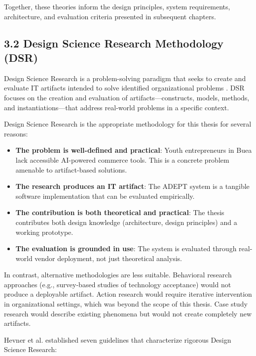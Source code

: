 \documentclass[12pt,a4paper]{article}
\begin{document}
Together, these theories inform the design principles, system requirements, architecture, and evaluation criteria presented in subsequent chapters.

\subsection{3.2 Design Science Research Methodology (DSR)}

Design Science Research is a problem-solving paradigm that seeks to create and evaluate IT artifacts intended to solve identified organizational problems \citep{hevner2004}. DSR focuses on the creation and evaluation of artifacts---constructs, models, methods, and instantiations---that address real-world problems in a specific context.

Design Science Research is the appropriate methodology for this thesis for several reasons:

\begin{itemize}
    \item \textbf{The problem is well-defined and practical}: Youth entrepreneurs in Buea lack accessible AI-powered commerce tools. This is a concrete problem amenable to artifact-based solutions.
    \item \textbf{The research produces an IT artifact}: The ADEPT system is a tangible software implementation that can be evaluated empirically.
    \item \textbf{The contribution is both theoretical and practical}: The thesis contributes both design knowledge (architecture, design principles) and a working prototype.
    \item \textbf{The evaluation is grounded in use}: The system is evaluated through real-world vendor deployment, not just theoretical analysis.
\end{itemize}

In contrast, alternative methodologies are less suitable. Behavioral research approaches (e.g., survey-based studies of technology acceptance) would not produce a deployable artifact. Action research would require iterative intervention in organizational settings, which was beyond the scope of this thesis. Case study research would describe existing phenomena but would not create completely new artifacts.

Hevner et al. \citep{hevner2004} established seven guidelines that characterize rigorous Design Science Research:
\end{document}
